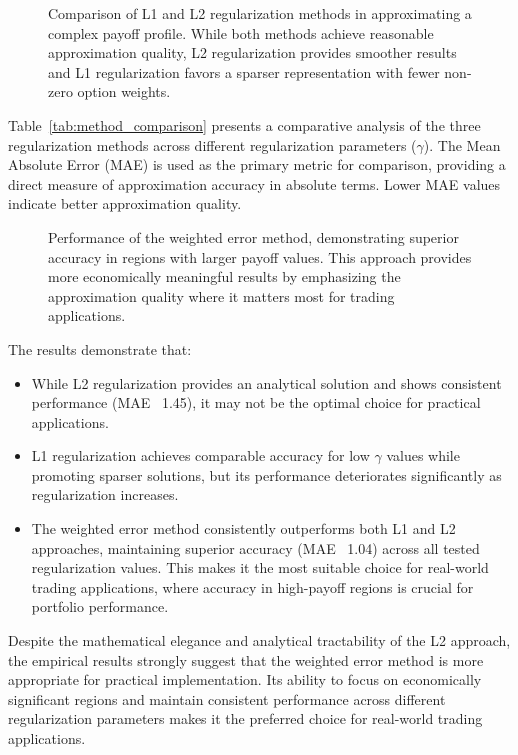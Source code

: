 \documentclass[12pt]{article}
\begin{document}
\begin{figure}[htbp]
\centering

\caption{Comparison of L1 and L2 regularization methods in approximating a complex payoff profile. 
While both methods achieve reasonable approximation quality, L2 regularization provides smoother results 
and L1 regularization favors a sparser representation with fewer non-zero option weights.}
\label{fig:regularization}
\end{figure}



Table~\ref{tab:method_comparison} presents a comparative analysis of the three regularization 
methods across different regularization parameters ($\gamma$). The Mean Absolute Error (MAE) 
is used as the primary metric for comparison, providing a direct measure of approximation accuracy 
in absolute terms. Lower MAE values indicate better approximation quality.

\begin{figure}[htbp]
\centering

\caption{Performance of the weighted error method, demonstrating superior accuracy in regions 
with larger payoff values. This approach provides more economically meaningful results by 
emphasizing the approximation quality where it matters most for trading applications.}
\label{fig:weighted}
\end{figure}

\vspace{1em}
The results demonstrate that:
\begin{itemize}
    \item While L2 regularization provides an analytical solution and shows consistent performance 
    (MAE ~1.45), it may not be the optimal choice for practical applications.
    \item L1 regularization achieves comparable accuracy for low $\gamma$ values while promoting 
    sparser solutions, but its performance deteriorates significantly as regularization increases.
    \item The weighted error method consistently outperforms both L1 and L2 approaches, maintaining 
    superior accuracy (MAE ~1.04) across all tested regularization values. This makes it the most 
    suitable choice for real-world trading applications, where accuracy in high-payoff regions is 
    crucial for portfolio performance.
\end{itemize}

Despite the mathematical elegance and analytical tractability of the L2 approach, the empirical 
results strongly suggest that the weighted error method is more appropriate for practical 
implementation. Its ability to focus on economically significant regions and maintain consistent 
performance across different regularization parameters makes it the preferred choice for 
real-world trading applications.
\end{document}
